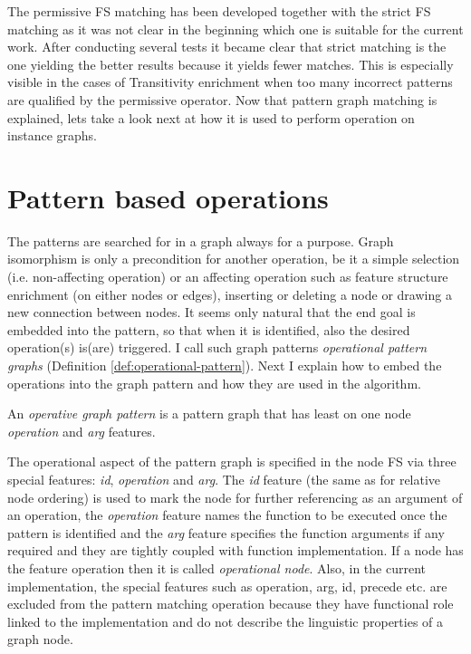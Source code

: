 The permissive FS matching has been developed together with the strict FS matching as it was not clear in the beginning which one is suitable for the current work. After conducting several tests it became clear that strict matching is the one yielding the better results because it yields fewer matches. This is especially visible in the cases of Transitivity enrichment when too many incorrect patterns are qualified by the permissive operator. Now that pattern graph matching is explained, lets take a look next at how it is used to perform operation on instance graphs.

\section{Pattern based operations}
\label{sec:pattern-based-operations}

The patterns are searched for in a graph always for a purpose. Graph isomorphism is only a precondition for another operation, be it a simple selection (i.e. non-affecting operation) or an affecting operation such as feature structure enrichment (on either nodes or edges), inserting or deleting a node or drawing a new connection between nodes. It seems only natural that the end goal is embedded into the pattern, so that when it is identified, also the desired operation(s) is(are) triggered. I call such graph patterns \textit{operational pattern graphs} (Definition \ref{def:operational-pattern}). Next I explain how to embed the operations into the graph pattern and how they are used in the algorithm. 

\begin{definition}\label{def:operational-pattern}
    An \textit{operative graph pattern} is a pattern graph that has least on one node \textit{operation} and \textit{arg} features.
\end{definition}

The operational aspect of the pattern graph is specified in the node FS via three special features: \textit{id}, \textit{operation} and \textit{arg}. The \textit{id} feature (the same as for relative node ordering) is used to mark the node for further referencing as an argument of an operation, the \textit{operation} feature names the function to be executed once the pattern is identified and the \textit{arg} feature specifies the function arguments if any required and they are tightly coupled with function implementation. If a node has the feature operation then it is called \textit{operational node}. Also, in the current implementation, the special features such as operation, arg, id, precede etc. are excluded from the pattern matching operation because they have functional role linked to the implementation and do not describe the linguistic properties of a graph node.

